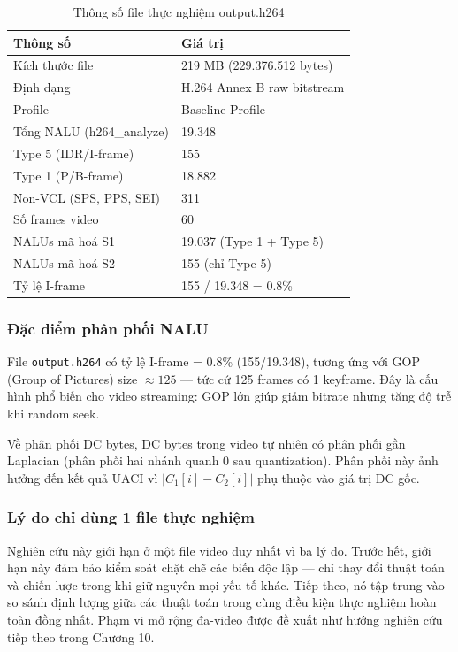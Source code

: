 \begin{table}[ht]
\centering
\caption{Thông số file thực nghiệm output.h264}
\label{tab:dataset}
\begin{tabular}{|l|l|}
\hline
\textbf{Thông số} & \textbf{Giá trị} \\
\hline
Kích thước file          & 219 MB (229.376.512 bytes) \\
\hline
Định dạng                & H.264 Annex B raw bitstream \\
\hline
Profile                  & Baseline Profile \\
\hline
Tổng NALU (h264\_analyze) & 19.348 \\
\hline
Type 5 (IDR/I-frame)      & 155 \\
\hline
Type 1 (P/B-frame)        & 18.882 \\
\hline
Non-VCL (SPS, PPS, SEI)  & 311 \\
\hline
Số frames video           & 60 \\
\hline
NALUs mã hoá S1           & 19.037 (Type 1 + Type 5) \\
\hline
NALUs mã hoá S2           & 155 (chỉ Type 5) \\
\hline
Tỷ lệ I-frame             & 155 / 19.348 = 0.8\% \\
\hline
\end{tabular}
\end{table}

\subsubsection{Đặc điểm phân phối NALU}

File \texttt{output.h264} có tỷ lệ I-frame = 0.8\% (155/19.348), tương ứng với GOP (Group of Pictures) size $\approx 125$ --- tức cứ 125 frames có 1 keyframe. Đây là cấu hình phổ biến cho video streaming: GOP lớn giúp giảm bitrate nhưng tăng độ trễ khi random seek.

Về phân phối DC bytes, DC bytes trong video tự nhiên có phân phối gần Laplacian (phân phối hai nhánh quanh 0 sau quantization). Phân phối này ảnh hưởng đến kết quả UACI vì $|C_1[i] - C_2[i]|$ phụ thuộc vào giá trị DC gốc.

\subsubsection{Lý do chỉ dùng 1 file thực nghiệm}

Nghiên cứu này giới hạn ở một file video duy nhất vì ba lý do. Trước hết, giới hạn này đảm bảo kiểm soát chặt chẽ các biến độc lập --- chỉ thay đổi thuật toán và chiến lược trong khi giữ nguyên mọi yếu tố khác. Tiếp theo, nó tập trung vào so sánh định lượng giữa các thuật toán trong cùng điều kiện thực nghiệm hoàn toàn đồng nhất. Phạm vi mở rộng đa-video được đề xuất như hướng nghiên cứu tiếp theo trong Chương 10.

